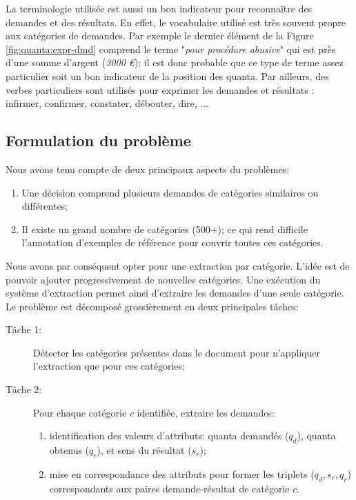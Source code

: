 La terminologie utilisée est aussi un bon indicateur pour reconnaître des demandes et des résultats. En effet, le vocabulaire utilisé est très souvent propre aux catégories de demandes. Par exemple le dernier élément de la Figure \ref{fig:quanta:expr-dmd} comprend le terme "\textit{pour procédure abusive}" qui est près d'une somme d'argent (\textit{3000 \euro{}}); il est donc probable que ce type de terme assez particulier soit un bon indicateur de la position des quanta. Par ailleurs, des verbes particuliers sont utilisés pour exprimer les demandes et résultats : infirmer, confirmer, constater, débouter, dire, ... %






\subsection{Formulation du problème}
\label{sec:quanta:formulation}

Nous avons tenu compte de deux principaux aspects du problèmes:
\begin{enumerate}
	\item Une décision comprend plusieurs demandes de catégories similaires ou différentes;
	\item  Il existe un grand nombre de catégories (500+); ce qui rend difficile l'annotation d'exemples de référence pour couvrir toutes ces catégories.
\end{enumerate}

Nous avons par conséquent opter pour une extraction par catégorie. L'idée est de pouvoir ajouter progressivement de nouvelles catégories. Une exécution du système d'extraction permet ainsi d'extraire les demandes d'une seule catégorie. Le problème est décomposé grossièrement en deux principales tâches:
\begin{description}
	\item[Tâche 1:] Détecter les catégories présentes dans le document pour n'appliquer l'extraction  que pour ces catégories;
	\item[Tâche 2:] Pour chaque catégorie $c$ identifiée, extraire les demandes:
	\begin{enumerate}
		\item identification des valeurs d'attributs: quanta demandés ($q_d$), quanta obtenus ($q_r$), et sens du résultat ($s_r$);
		\item mise en correspondance des attributs pour former les triplets ($q_d, s_r, q_r$) correspondants aux paires demande-résultat de catégorie $c$.
	\end{enumerate}
\end{description}

